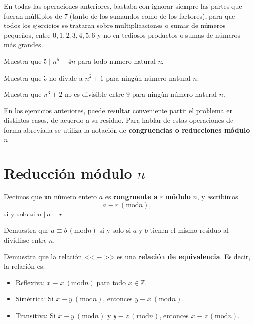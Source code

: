 En todas las operaciones anteriores, bastaba con ignorar siempre las partes que fueran múltiplos de $7$ (tanto de los sumandos como de los factores), para que todos los ejercicios se trataran sobre multiplicaciones o sumas de números pequeños, entre $0,1,2,3,4,5,6$ y no en tediosos productos o sumas de números más grandes.

\begin{ejercicio}
Muestra que $5\mid n^5+4n$ para todo número natural $n$.
\end{ejercicio}

\begin{ejercicio}
Muestra que $3$ no divide a $n^2+1$ para ningún número natural $n$.
\end{ejercicio}

\begin{ejercicio}
Muestra que $n^3+2$ no es divisible entre $9$ para ningún número natural $n$.
\end{ejercicio}

En los ejercicios anteriores, puede resultar conveniente partir el problema en distintos casos, de acuerdo a su residuo. Para hablar de estas operaciones de forma abreviada se utiliza la notación de {\bf congruencias o reducciones módulo} $n$.


\section{Reducción módulo $n$}

Decimos que un número entero $a$ es {\bf congruente a} $r$ {\bf módulo} $n$, y escribimos $$a\equiv r~(\mathrm {mod} n),$$ si y solo si $n\mid a-r$.

\begin{ejercicio}
Demuestra que $a\equiv b~(\mathrm {mod} n)$ si y solo si $a$ y $b$ tienen el mismo residuo al dividirse entre $n$.
\end{ejercicio}

\begin{ejercicio} Demuestra que la relación <<$\equiv$>> es una {\bf relación de equivalencia}. Es decir, la relación es:
\begin{itemize}
\item Reflexiva: $x\equiv x~(\mathrm {mod} n)$ para todo $x\in \mathbb Z$.
\item Simétrica: Si $x\equiv y ~(\mathrm {mod} n)$, entonces $y \equiv x ~(\mathrm {mod} n)$.
\item Transitiva: Si $x\equiv y~(\mathrm {mod} n)$ y $y\equiv z~(\mathrm {mod} n)$, entonces $x \equiv z~(\mathrm {mod} n)$.
\end{itemize}
\end{ejercicio}

